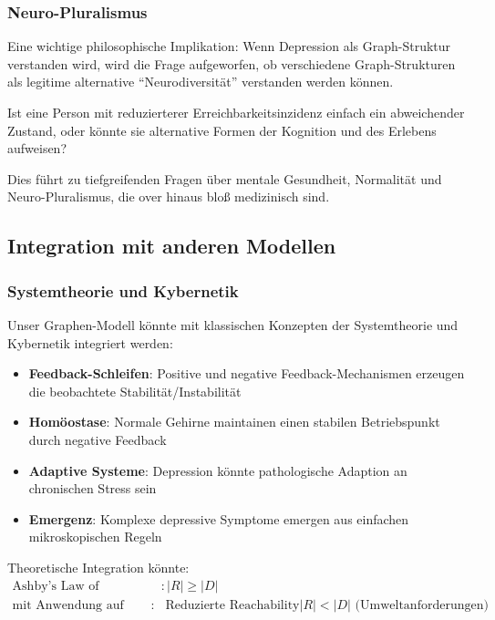 \documentclass[a4paper,12pt]{article}
\theoremstyle{definition}
\begin{document}
\subsubsection{Neuro-Pluralismus}

Eine wichtige philosophische Implikation: Wenn Depression als Graph-Struktur verstanden wird, wird die Frage aufgeworfen, ob verschiedene Graph-Strukturen als legitime alternative ``Neurodiversität'' verstanden werden können.

Ist eine Person mit reduzierterer Erreichbarkeitsinzidenz einfach ein abweichender Zustand, oder könnte sie alternative Formen der Kognition und des Erlebens aufweisen?

Dies führt zu tiefgreifenden Fragen über mentale Gesundheit, Normalität und Neuro-Pluralismus, die over hinaus bloß medizinisch sind.

\subsection{Integration mit anderen Modellen}

\subsubsection{Systemtheorie und Kybernetik}

Unser Graphen-Modell könnte mit klassischen Konzepten der Systemtheorie und Kybernetik integriert werden:

\begin{itemize}
	\item \textbf{Feedback-Schleifen}: Positive und negative Feedback-Mechanismen erzeugen die beobachtete Stabilität/Instabilität
	\item \textbf{Homöostase}: Normale Gehirne maintainen einen stabilen Betriebspunkt durch negative Feedback
	\item \textbf{Adaptive Systeme}: Depression könnte pathologische Adaption an chronischen Stress sein
	\item \textbf{Emergenz}: Komplexe depressive Symptome emergen aus einfachen mikroskopischen Regeln
\end{itemize}

Theoretische Integration könnte:
\begin{align}
\text{Ashby's Law of Requisite Variety} &: |R| \geq |D| \\
\text{mit Anwendung auf Depression}: &\text{ Reduzierte Reachability} |R| < |D| \text{ (Umweltanforderungen)}
\end{align}
\end{document}
